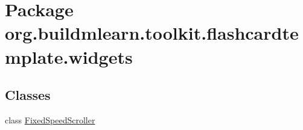 \hypertarget{namespaceorg_1_1buildmlearn_1_1toolkit_1_1flashcardtemplate_1_1widgets}{}\section{Package org.\+buildmlearn.\+toolkit.\+flashcardtemplate.\+widgets}
\label{namespaceorg_1_1buildmlearn_1_1toolkit_1_1flashcardtemplate_1_1widgets}
\subsection*{Classes}
\begin{DoxyCompactItemize}
\item 
class \hyperlink{classorg_1_1buildmlearn_1_1toolkit_1_1flashcardtemplate_1_1widgets_1_1FixedSpeedScroller}{Fixed\+Speed\+Scroller}
\end{DoxyCompactItemize}
